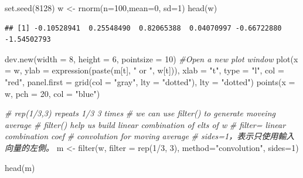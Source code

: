 \documentclass[
]{book}
\newenvironment{Shaded}{\begin{snugshade}}{\end{snugshade}}
\newcommand{\AttributeTok}[1]{\textcolor[rgb]{0.77,0.63,0.00}{#1}}
\newcommand{\CommentTok}[1]{\textcolor[rgb]{0.56,0.35,0.01}{\textit{#1}}}
\newcommand{\DecValTok}[1]{\textcolor[rgb]{0.00,0.00,0.81}{#1}}
\newcommand{\FunctionTok}[1]{\textcolor[rgb]{0.00,0.00,0.00}{#1}}
\newcommand{\NormalTok}[1]{#1}
\newcommand{\OtherTok}[1]{\textcolor[rgb]{0.56,0.35,0.01}{#1}}
\newcommand{\SpecialCharTok}[1]{\textcolor[rgb]{0.00,0.00,0.00}{#1}}
\newcommand{\StringTok}[1]{\textcolor[rgb]{0.31,0.60,0.02}{#1}}
\theoremstyle{definition}
\theoremstyle{definition}
\theoremstyle{definition}
\theoremstyle{definition}
\theoremstyle{remark}
\begin{document}
\begin{Shaded}
\begin{Highlighting}[]
\FunctionTok{set.seed}\NormalTok{(}\DecValTok{8128}\NormalTok{)}
\NormalTok{w }\OtherTok{\textless{}{-}} \FunctionTok{rnorm}\NormalTok{(}\AttributeTok{n=}\DecValTok{100}\NormalTok{,}\AttributeTok{mean=}\DecValTok{0}\NormalTok{, }\AttributeTok{sd=}\DecValTok{1}\NormalTok{)}
\FunctionTok{head}\NormalTok{(w)}
\end{Highlighting}
\end{Shaded}

\begin{verbatim}
## [1] -0.10528941  0.25548490  0.82065388  0.04070997 -0.66722880 -1.54502793
\end{verbatim}

\begin{Shaded}
\begin{Highlighting}[]
\FunctionTok{dev.new}\NormalTok{(}\AttributeTok{width =} \DecValTok{8}\NormalTok{, }\AttributeTok{height =} \DecValTok{6}\NormalTok{, }\AttributeTok{pointsize =} \DecValTok{10}\NormalTok{) }\CommentTok{\#Open a new plot window}
\FunctionTok{plot}\NormalTok{(}\AttributeTok{x =}\NormalTok{ w, }\AttributeTok{ylab =} \FunctionTok{expression}\NormalTok{(}\FunctionTok{paste}\NormalTok{(m[t], }\StringTok{" or "}\NormalTok{, w[t])), }\AttributeTok{xlab =} \StringTok{"t"}\NormalTok{, }\AttributeTok{type =} \StringTok{"l"}\NormalTok{, }\AttributeTok{col =} \StringTok{"red"}\NormalTok{,}
        \AttributeTok{panel.first =} \FunctionTok{grid}\NormalTok{(}\AttributeTok{col =} \StringTok{"gray"}\NormalTok{, }\AttributeTok{lty =} \StringTok{"dotted"}\NormalTok{), }\AttributeTok{lty =} \StringTok{"dotted"}\NormalTok{)}
  \FunctionTok{points}\NormalTok{(}\AttributeTok{x =}\NormalTok{ w, }\AttributeTok{pch =} \DecValTok{20}\NormalTok{, }\AttributeTok{col =} \StringTok{"blue"}\NormalTok{)}
\end{Highlighting}
\end{Shaded}

\begin{Shaded}
\begin{Highlighting}[]
\CommentTok{\# rep(1/3,3) repeats 1/3 3 times}
\CommentTok{\# we can use filter() to generate moveing average}
\CommentTok{\# filter() help us build linear combination of elts of w}
\CommentTok{\# filter= linear combination coef}
\CommentTok{\# convolution for moving average}
\CommentTok{\# sides=1，表示只使用輸入向量的左側。}
\NormalTok{m }\OtherTok{\textless{}{-}} \FunctionTok{filter}\NormalTok{(w, }\AttributeTok{filter =} \FunctionTok{rep}\NormalTok{(}\DecValTok{1}\SpecialCharTok{/}\DecValTok{3}\NormalTok{, }\DecValTok{3}\NormalTok{), }\AttributeTok{method=}\StringTok{"convolution"}\NormalTok{, }\AttributeTok{sides=}\DecValTok{1}\NormalTok{)}

\FunctionTok{head}\NormalTok{(m)}
\end{Highlighting}
\end{Shaded}
\end{document}
